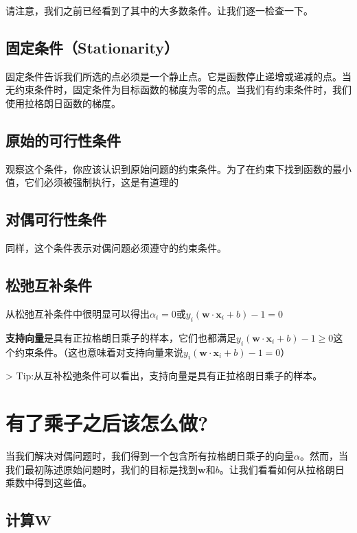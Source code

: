 请注意，我们之前已经看到了其中的大多数条件。让我们逐一检查一下。

\subsection{ 固定条件（Stationarity）}
固定条件告诉我们所选的点必须是一个静止点。它是函数停止递增或递减的点。当无约束条件时，固定条件为目标函数的梯度为零的点。当我们有约束条件时，我们使用拉格朗日函数的梯度。

\subsection{原始的可行性条件}

观察这个条件，你应该认识到原始问题的约束条件。为了在约束下找到函数的最小值，它们必须被强制执行，这是有道理的

\subsection{对偶可行性条件}

同样，这个条件表示对偶问题必须遵守的约束条件。

\subsection{松弛互补条件}

从松弛互补条件中很明显可以得出$\alpha_i=0$或$y_i (\mathbf{w} \cdot \mathbf{x}_i + b) -1=0$

\textbf{支持向量}是具有正拉格朗日乘子的样本，它们也都满足$y_i (\mathbf{w} \cdot \mathbf{x}_i + b) -1 \geq 0$这个约束条件。（这也意味着对支持向量来说$y_i (\mathbf{w} \cdot \mathbf{x}_i + b) -1=0$）

> Tip:从互补松弛条件可以看出，支持向量是具有正拉格朗日乘子的样本。

\section{有了乘子之后该怎么做?}

当我们解决对偶问题时，我们得到一个包含所有拉格朗日乘子的向量$\alpha$。然而，当我们最初陈述原始问题时，我们的目标是找到$\mathbf{w}$和$b$。让我们看看如何从拉格朗日乘数中得到这些值。

\subsection{计算$\mathbf{W}$}

